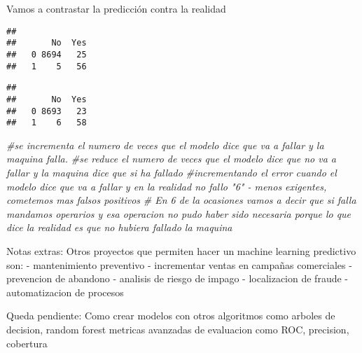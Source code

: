 \documentclass[
]{article}
\newenvironment{Shaded}{\begin{snugshade}}{\end{snugshade}}
\newcommand{\CommentTok}[1]{\textcolor[rgb]{0.56,0.35,0.01}{\textit{#1}}}
\newcommand{\FunctionTok}[1]{\textcolor[rgb]{0.00,0.00,0.00}{#1}}
\newcommand{\NormalTok}[1]{#1}
\newcommand{\SpecialCharTok}[1]{\textcolor[rgb]{0.00,0.00,0.00}{#1}}
\begin{document}
Vamos a contrastar la predicción contra la realidad

\begin{Shaded}
\end{Shaded}

\begin{verbatim}
##    
##       No  Yes
##   0 8694   25
##   1    5   56
\end{verbatim}

\begin{Shaded}
\end{Shaded}

\begin{verbatim}
##    
##       No  Yes
##   0 8693   23
##   1    6   58
\end{verbatim}

\begin{Shaded}
\begin{Highlighting}[]
\CommentTok{\#se incrementa el numero de veces que el modelo dice que va a fallar y la maquina falla.}
\CommentTok{\#se reduce el numero de veces que el modelo dice que no va a fallar y la maquina dice que si ha fallado}
\CommentTok{\#incrementando el error cuando el modelo dice que va a fallar y en la realidad no fallo "6" {-} menos exigentes, cometemos mas falsos positivos}
\CommentTok{\# En 6 de la ocasiones vamos a decir que si falla mandamos operarios y esa operacion no pudo haber sido necesaria porque lo que dice la realidad es que no hubiera fallado la maquina}
\end{Highlighting}
\end{Shaded}

Notas extras: Otros proyectos que permiten hacer un machine learning
predictivo son: - mantenimiento preventivo - incrementar ventas en
campañas comerciales - prevencion de abandono - analisis de riesgo de
impago - localizacion de fraude - automatizacion de procesos

Queda pendiente: Como crear modelos con otros algoritmos como arboles de
decision, random forest metricas avanzadas de evaluacion como ROC,
precision, cobertura
\end{document}
